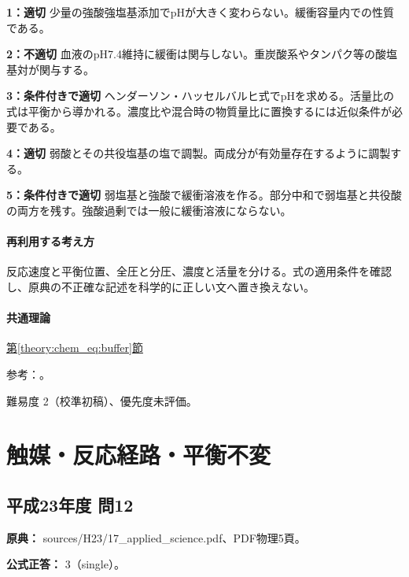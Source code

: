 \noindent\textbf{1：適切} 少量の強酸強塩基添加でpHが大きく変わらない。緩衝容量内での性質である。\par

\noindent\textbf{2：不適切} 血液のpH7.4維持に緩衝は関与しない。重炭酸系やタンパク等の酸塩基対が関与する。\par

\noindent\textbf{3：条件付きで適切} ヘンダーソン・ハッセルバルヒ式でpHを求める。活量比の式は平衡から導かれる。濃度比や混合時の物質量比に置換するには近似条件が必要である。\par

\noindent\textbf{4：適切} 弱酸とその共役塩基の塩で調製。両成分が有効量存在するように調製する。\par

\noindent\textbf{5：条件付きで適切} 弱塩基と強酸で緩衝溶液を作る。部分中和で弱塩基と共役酸の両方を残す。強酸過剰では一般に緩衝溶液にならない。\par

\paragraph{再利用する考え方} 反応速度と平衡位置、全圧と分圧、濃度と活量を分ける。式の適用条件を確認し、原典の不正確な記述を科学的に正しい文へ置き換えない。

\paragraph{共通理論} \hyperref[theory:chem_eq:buffer]{第\ref*{theory:chem_eq:buffer}節}

\par 参考：\cite{iupac_greenbook2012,mit_buffer2008}。

\par 難易度 2（校準初稿）、優先度未評価。

\section{触媒・反応経路・平衡不変}

\subsection{平成23年度 問12}
\label{q:h23-reg-applied-12}

\noindent\textbf{原典：} sources/H23/17\_applied\_science.pdf、PDF物理5頁。

\textbf{公式正答：} 3（single）。

